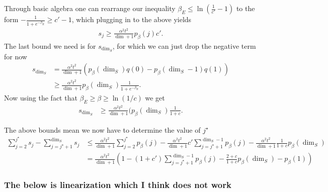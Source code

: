 \documentclass{article}
\newcommand{\parens}[1]{\left( #1 \right)}
\begin{document}
Through basic algebra one can rearrange our inequality $\beta_E \le \ln \left( \frac{1}{c'} - 1\right)$ to the form $-\frac{1}{1 + e^{-\beta_E}} \geq c' - 1$, which plugging in to the above yields
\begin{align}
    s_j \ge \frac{\alpha^2 t^2}{\dim + 1} p_{\beta}(j) c'.
\end{align}
The last bound we need is for $s_{\dim_S}$, for which we can just drop the negative term for now
\begin{align}
    s_{\dim_S} &= \frac{\alpha^2 t^2}{\dim + 1} (p_{\beta}(\dim_S) q(0) - p_{\beta}(\dim_S - 1) q(1)) \\
    &\ge \frac{\alpha^2 t^2}{\dim + 1} p_{\beta}(\dim_S) \frac{1}{1 + e^{-\beta_E}}.
\end{align}
Now using the fact that $\beta_E \ge \beta \ge \ln (1/ c)$ we get 
\begin{align}
    s_{\dim_S} &\ge \frac{\alpha^2 t^2}{\dim + 1} (p_{\beta}(\dim_S) \frac{1}{1 + c}.
\end{align}

The above bounds mean we now have to determine the value of $j^{\star}$
\begin{align}
    \sum_{j = 2}^{j^\star} s_j - \sum_{j=j^{\star} + 1}^{\dim_S} s_j &\le \frac{\alpha^2 t^2}{\dim + 1} \sum_{j = 2}^{j^\star} p_{\beta}(j) - \frac{\alpha^2 t^2}{\dim + 1} c' \sum_{j=j^{\star} + 1}^{\dim_S  -1} p_{\beta}(j) - \frac{\alpha^2 t^2}{\dim + 1} \frac{1}{1 + c} p_{\beta}(\dim_S) \\
    &= \frac{\alpha^2 t^2}{\dim + 1} \parens{1 - (1 + c')\sum_{j=j^{\star} + 1}^{\dim_S  -1} p_{\beta}(j) - \frac{2 + c}{1 + c} p_{\beta}(\dim_S) - p_{\beta}(1) }
\end{align}

\subsubsection{The below is linearization which I think does not work}
\end{document}
